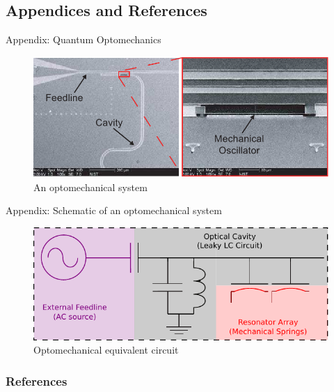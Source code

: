 \documentclass[10pt,reqno]{beamer}
\begin{document}
\subsection{Appendices and References}
\begin{frame}{Appendix: Quantum Optomechanics}
\begin{figure}
\includegraphics[width=0.9\linewidth]{cavity.jpg}\caption{An optomechanical system~\cite{nanoimg}}
\end{figure}
\end{frame}
\begin{frame}{Appendix: Schematic of an optomechanical system}
\begin{figure}
	\includegraphics[width=0.9\linewidth]{schem2}\caption{Optomechanical equivalent circuit}
\end{figure}
\end{frame}
\begin{frame}[allowframebreaks]
\frametitle{References}
\tiny
\printbibliography
\end{frame}
\end{document}
